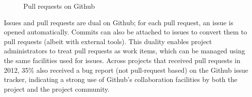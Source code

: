 \documentclass{acm_proc_article-sp}
\begin{document}
\begin{figure}[t]
  \centering
{}
\caption{Pull requests on Github}
\end{figure}

Issues and pull requests are dual on Github; for each pull request, an issue is
opened automatically. Commits can also be attached to issues to convert them to
pull requests (albeit with external tools). This duality enables project
administrators to treat pull requests as work items, which can be managed using
the same facilities used for issues. Across projects that received pull
requests in 2012, 35\% also received a bug report (not pull-request based) 
on the Github issue tracker, indicating a strong use of Github's collaboration
facilities by both the project and the project community.

%
\end{document}
